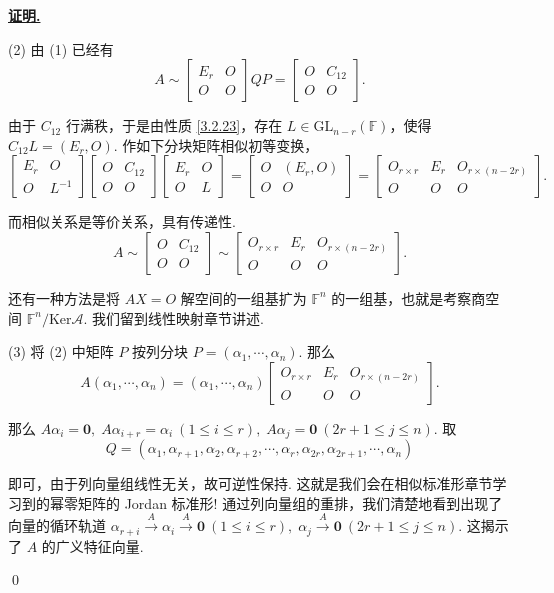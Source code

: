 \documentclass[10pt,openany]{article}
\theoremstyle{thmstyle} %
\theoremstyle{defstyle} %
\theoremstyle{prostyle} %
\theoremstyle{exastyle}
\theoremstyle{remstyle}
\renewenvironment{proof}[1][证明]{\par\underline{\textbf{#1.}} \;\fangsong}{\qed\par}
\newcommand{\F}{\mathbb{F}}
\begin{document}
\begin{proof}
	
	(2) 由 (1) 已经有
	\[ A \sim \begin{bmatrix}
		E_r & O \\
		O & O
	\end{bmatrix} QP= \begin{bmatrix}
	O & C_{12} \\
	O & O
	\end{bmatrix}. \]
	
	由于 \( C_{12} \) 行满秩，于是由性质 \ref{3.2.23}，存在 \( L \in \text{GL}_{n-r}(\F) \)，使得 \( C_{12}L=(E_r,O) \). 作如下分块矩阵相似初等变换，
	\[ \begin{bmatrix}
		E_r & O \\
		O & L^{-1}
	\end{bmatrix}\begin{bmatrix}
	O & C_{12} \\
	O & O
	\end{bmatrix}\begin{bmatrix}
	E_r & O \\
	O & L
	\end{bmatrix}=\begin{bmatrix}
	O & (E_r,O) \\
	O & O
	\end{bmatrix}=\begin{bmatrix}
	O_{r \times r} & E_r & O_{r \times (n-2r)} \\
	O & O & O
	\end{bmatrix}. \]
	
	而相似关系是等价关系，具有传递性.
	\[ A \sim \begin{bmatrix}
		O & C_{12} \\
		O & O
	\end{bmatrix} \sim \begin{bmatrix}
	O_{r \times r} & E_r & O_{r \times (n-2r)} \\
	O & O & O
	\end{bmatrix}. \]
	
	还有一种方法是将 \( AX=O \) 解空间的一组基扩为 \( \F^n \) 的一组基，也就是考察商空间 \( \F^n/ \mathrm{Ker}\mathscr{A} \). 我们留到线性映射章节讲述.
	
	(3) 将 (2) 中矩阵 \( P \) 按列分块 \( P=(\alpha_1,\cdots,\alpha_n) \). 那么
	\[ A(\alpha_1,\cdots,\alpha_n)=(\alpha_1,\cdots,\alpha_n) \begin{bmatrix}
		O_{r \times r} & E_r & O_{r \times (n-2r)} \\
		O & O & O
	\end{bmatrix}. \]
	
	那么 \( A\alpha_i=\bm{0}, \; A\alpha_{i+r}=\alpha_i \ (1 \leq i \leq r), \; A\alpha_j=\bm{0} \ (2r+1 \leq j \leq n)  \). 取
	\[  Q=(\alpha_1,\alpha_{r+1},\alpha_2,\alpha_{r+2},\cdots,\alpha_r,\alpha_{2r},\alpha_{2r+1},\cdots,\alpha_{n}) \]
	
	即可，由于列向量组线性无关，故可逆性保持. 这就是我们会在相似标准形章节学习到的幂零矩阵的 Jordan 标准形! 通过列向量组的重排，我们清楚地看到出现了向量的循环轨道 \( \alpha_{r+i} \overset{A}{\to} \alpha_i \overset{A}{\to} \bm{0} \ (1 \leq i \leq r), \; \alpha_{j}  \overset{A}{\to} \bm{0} \ (2r+1 \leq j \leq n) \). 这揭示了 \( A \) 的广义特征向量.
	
\end{proof}
\end{document}
